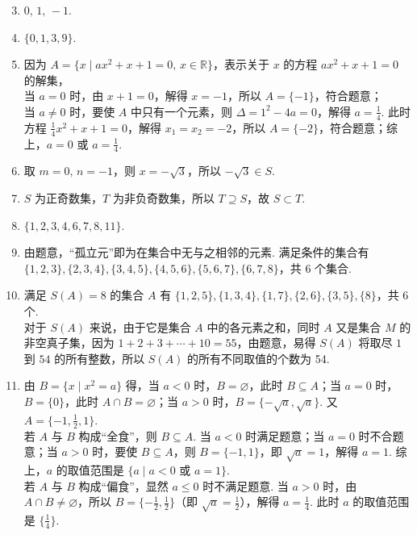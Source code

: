 \documentclass[a4paper,11pt]{article}
\begin{document}
\ifanswer
{}

\begin{enumerate}
\setcounter{enumi}{2}
\item $0,\,1,\,-1$.
\item $\{0,1,3,9\}$.
\item 因为 $A=\{x \mid ax^2+x+1=0,\, x\in\mathbb{R}\}$，表示关于 $x$ 的方程 $ax^2+x+1=0$ 的解集，\\
当 $a=0$ 时，由 $x+1=0$，解得 $x=-1$，所以 $A=\{-1\}$，符合题意；\\
当 $a\neq 0$ 时，要使 $A$ 中只有一个元素，则 $\Delta=1^2-4a=0$，解得 $a=\tfrac{1}{4}$. 此时方程 $\tfrac{1}{4}x^2+x+1=0$，解得 $x_1=x_2=-2$，所以 $A=\{-2\}$，符合题意；综上，$a=0$ 或 $a=\tfrac{1}{4}$.
\item 取 $m=0,\, n=-1$，则 $x=-\sqrt{3}$，所以 $-\sqrt{3}\in S$.
\item $S$ 为正奇数集，$T$ 为非负奇数集，所以 $T \supseteq S$，故 $S \subset T$.
\item $\{1,2,3,4,6,7,8,11\}$.
\item 由题意，“孤立元”即为在集合中无与之相邻的元素. 满足条件的集合有 $\{1,2,3\},\allowbreak\{2,3,4\},\allowbreak\{3,4,5\},\allowbreak\{4,5,6\},\allowbreak\{5,6,7\},\allowbreak\{6,7,8\}$，共 6 个集合.
\item 满足 $S(A)=8$ 的集合 $A$ 有 $\{1,2,5\},\{1,3,4\},\{1,7\},\{2,6\},\{3,5\},\{8\}$，共 6 个.\\
对于 $S(A)$ 来说，由于它是集合 $A$ 中的各元素之和，同时 $A$ 又是集合 $M$ 的非空真子集，因为 $1+2+3+\cdots+10=55$，由题意，易得 $S(A)$ 将取尽 $1$ 到 $54$ 的所有整数，所以 $S(A)$ 的所有不同取值的个数为 54.
\item 由 $B=\{x \mid x^2=a\}$ 得，当 $a<0$ 时，$B=\varnothing$，此时 $B\subseteq A$；当 $a=0$ 时，$B=\{0\}$，此时 $A\cap B=\varnothing$；当 $a>0$ 时，$B=\{-\sqrt{a},\sqrt{a}\}$. 又 $A=\{-1,\tfrac{1}{2},1\}$.\\
若 $A$ 与 $B$ 构成“全食”，则 $B\subseteq A$. 当 $a<0$ 时满足题意；当 $a=0$ 时不合题意；当 $a>0$ 时，要使 $B\subseteq A$，则 $B=\{-1,1\}$，即 $\sqrt{a}=1$，解得 $a=1$. 综上，$a$ 的取值范围是 $\{a \mid a<0 \text{ 或 } a=1\}$.\\
若 $A$ 与 $B$ 构成“偏食”，显然 $a\le 0$ 时不满足题意. 当 $a>0$ 时，由 $A\cap B\neq\varnothing$，所以 $B=\{-\tfrac{1}{2},\tfrac{1}{2}\}$（即 $\sqrt{a}=\tfrac{1}{2}$），解得 $a=\tfrac{1}{4}$. 此时 $a$ 的取值范围是 $\{\tfrac{1}{4}\}$.


\end{enumerate}
\end{document}
